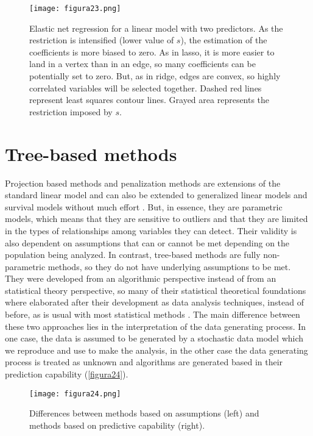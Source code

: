 \begin{figure}[hbtp]
\centering
\texttt{[image: figura23.png]}
\caption{Elastic net regression for a linear model with two predictors. As the restriction is intensified (lower value of $s$), the estimation of the coefficients is more biased to zero. As in lasso, it is more easier to land in a vertex than in an edge, so many coefficients can be potentially set to zero. But, as in ridge, edges are convex, so highly correlated variables will be selected together. Dashed red lines represent least squares contour lines. Grayed area represents the restriction imposed by $s$.}
\label{figura23}
\end{figure}

\section{Tree-based methods}
Projection based methods and penalization methods are extensions of the standard linear model and can also be extended to generalized linear models and survival models without much effort \parencite{nygaard2008partial, simon2011regularization}. But, in essence, they are parametric models, which means that they are sensitive to outliers \parencite{liebmann2010robust, park2016robust} and that they are limited in the types of relationships among variables they can detect. Their validity is also dependent on assumptions that can or cannot be met depending on the population being analyzed. In contrast, tree-based methods are fully non-parametric methods, so they do not have underlying assumptions to be met. They were developed from an algorithmic perspective instead of from an statistical theory perspective, so many of their statistical theoretical foundations where elaborated after their development as data analysis techniques, instead of before, as is usual with most statistical methods \parencite{breiman2001statistical}. The main difference between these two approaches lies in the interpretation of the data generating process. In one case, the data is assumed to be generated by a stochastic data model which we reproduce and use to make the analysis, in the other case the data generating process is treated as unknown and algorithms are generated based in their prediction capability (\autoref{figura24}).

\begin{figure}[hbtp]
\centering
\texttt{[image: figura24.png]}
\caption{Differences between methods based on assumptions (left) and methods based on predictive capability (right).}
\label{figura24}
\end{figure}

